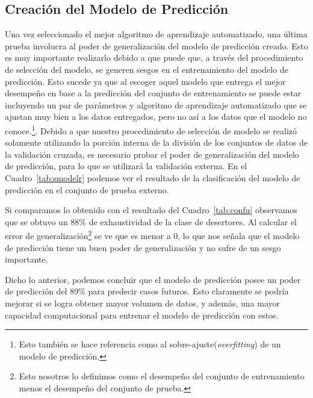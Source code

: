 
\subsection{Creación del Modelo de Predicción}
Una vez seleccionado el mejor algoritmo de aprendizaje automatizado, una última prueba involucra al poder de generalización del modelo de predicción creado. Esto es muy importante realizarlo debido a que puede que, a través del procedimiento de selección del modelo, se generen sesgos en el entrenamiento del modelo de predicción. Esto sucede ya que al escoger aquel modelo que entrega el mejor desempeño en base a la predicción del conjunto de entrenamiento se puede estar incluyendo un par de parámetros y algoritmo de aprendizaje automatizado que se ajustan muy bien a los datos entregados, pero no así a los datos que el modelo no conoce.\footnote{Esto también se hace referencia como al sobre-ajuste(\textit{overfitting}) de un modelo de predicción.}. Debido a que nuestro procedimiento de selección de modelo se realizó solamente utilizando la porción interna de la división de los conjuntos de datos de la validación cruzada, es necesario probar el poder de generalización del modelo de predicción, para lo que se utilizará la validación externa. En el Cuadro~\ref{tab:smodelr} podemos ver el resultado de la clasificación del modelo de predicción en el conjunto de prueba externo.


Si comparamos lo obtenido con el resultado del Cuadro~\ref{tab:confu} observamos que se obtuvo un 88\% de exhaustividad de la clase de desertores. Al calcular el error de generalización\footnote{Esto nosotros lo definimos como el desempeño del conjunto de entrenamiento menos el desempeño del conjunto de prueba.} se ve que es menor a 0, lo que nos señala que el modelo de predicción tiene un buen poder de generalización y no sufre de un sesgo importante.

Dicho lo anterior, podemos concluir que el modelo de predicción posee un poder de predicción del 89\% para predecir casos futuros. Esto claramente se podría mejorar si se logra obtener mayor volumen de datos, y además, una mayor capacidad computacional para entrenar el modelo de predicción con estos.

